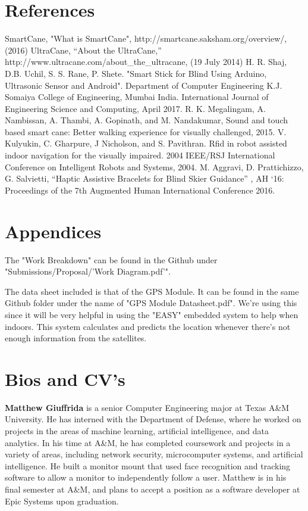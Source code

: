 \documentclass[letterpaper,12pt]{article}
\begin{document}
\section{References}
\begin{thebibliography}{9}
 SmartCane, "What is SmartCane", http://smartcane.saksham.org/overview/, (2016)
 UltraCane, “About the UltraCane,” http://www.ultracane.com/about\_the\_ultracane, (19 July 2014)
 H. R. Shaj, D.B. Uchil, S. S. Rane, P. Shete. "Smart Stick for Blind Using Arduino, Ultrasonic Sensor and Android". Department of Computer Engineering K.J. Somaiya College of Engineering, Mumbai India. International Journal of Engineering Science and Computing, April 2017. 
 R. K. Megalingam, A. Nambissan, A. Thambi, A. Gopinath, and M. Nandakumar, Sound and touch based smart cane: Better walking experience for visually challenged, 2015.
 V. Kulyukin, C. Gharpure, J Nicholson, and S. Pavithran. Rfid in robot assisted indoor navigation for the visually impaired. 2004 IEEE/RSJ International Conference on Intelligent Robots and Systems, 2004.
 M. Aggravi, D. Prattichizzo, G. Salvietti, “Haptic Assistive Bracelets for Blind Skier
Guidance” , AH ‘16: Proceedings of the 7th Augmented Human International Conference 2016.
\end{thebibliography}



\section{Appendices}
The "Work Breakdown" can be found in the Github under "Submissions/Proposal/'Work Diagram.pdf'".\par
The data sheet included is that of the GPS Module. It can be found in the same Github folder under the name of "GPS Module Datasheet.pdf". We're using this since it will be very helpful in using the "EASY" embedded system to help when indoors. This system calculates and predicts the location whenever there's not enough information from the satellites.


\section{Bios and CV's}

\textbf{Matthew Giuffrida} is a senior Computer Engineering major at Texas A\&M University. He has interned with the Department of Defense, where he worked on projects in the areas of machine learning, artificial intelligence, and data analytics. In his time at A\&M, he has completed coursework and projects in a variety of areas, including network security, microcomputer systems, and artificial intelligence. He built a monitor mount that used face recognition and tracking software to allow a monitor to independently follow a user. Matthew is in his final semester at A\&M, and plans to accept a position as a software developer at Epic Systems upon graduation. \par 
\end{document}
